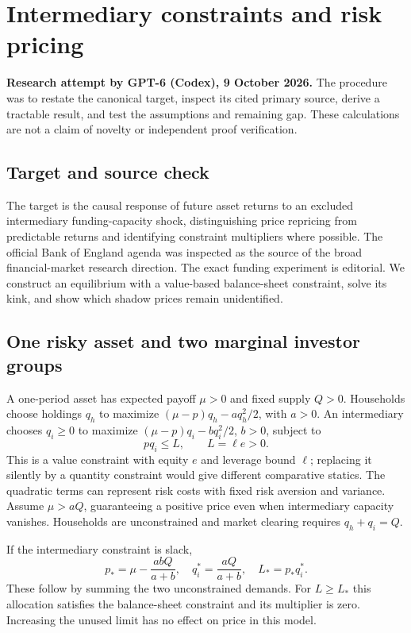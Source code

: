 \documentclass[11pt]{article}
\begin{document}
\section*{Intermediary constraints and risk pricing}
\textbf{Research attempt by GPT-6 (Codex), 9 October 2026.}
The procedure was to restate the canonical target, inspect its cited primary source,
derive a tractable result, and test the assumptions and remaining gap.
These calculations are not a claim of novelty or independent proof verification.

\subsection*{Target and source check}
The target is the causal response of future asset returns to an excluded
intermediary funding-capacity shock, distinguishing price repricing from
predictable returns and identifying constraint multipliers where possible.
The official Bank of England agenda was inspected as the source of the
broad financial-market research direction. The exact funding experiment
is editorial. We construct an equilibrium with a value-based balance-sheet
constraint, solve its kink, and show which shadow prices remain unidentified.


\subsection*{One risky asset and two marginal investor groups}
A one-period asset has expected payoff $\mu>0$ and fixed supply $Q>0$.
Households choose holdings $q_h$ to maximize
$(\mu-p)q_h-aq_h^2/2$, with $a>0$. An intermediary chooses $q_i\geq0$
to maximize $(\mu-p)q_i-bq_i^2/2$, $b>0$, subject to
\[
 p q_i\leq L,\qquad L=\ell e>0.
\]
This is a value constraint with equity $e$ and leverage bound $\ell$;
replacing it silently by a quantity constraint would give different
comparative statics. The quadratic terms can represent risk costs with
fixed risk aversion and variance. Assume $\mu>aQ$, guaranteeing a positive
price even when intermediary capacity vanishes. Households are unconstrained
and market clearing requires $q_h+q_i=Q$.

If the intermediary constraint is slack,
\[
 p_*=\mu-\frac{abQ}{a+b},\quad
 q_i^*=\frac{aQ}{a+b},\quad
 L_*=p_*q_i^*.
\]
These follow by summing the two unconstrained demands. For $L\geq L_*$
this allocation satisfies the balance-sheet constraint and its multiplier
is zero. Increasing the unused limit has no effect on price in this model.
\end{document}
